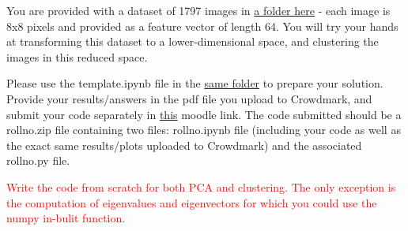\documentclass[solution,addpoints,12pt]{exam}
\newcommand{\red}[1]{\textcolor{red}{#1}}
\begin{document}
\begin{questions}


You are provided with a dataset of 1797 images in \href{https://drive.google.com/drive/folders/1emTvy-U4ZBnefQBddwTWP49oGQm8V2Gs?usp=sharing}{a folder here} - each image is 8x8 pixels and provided as a feature vector of length 64. You will try your hands at transforming this dataset to a lower-dimensional space, and clustering the images in this reduced space. 

Please use the template.ipynb file in the \href{https://drive.google.com/drive/folders/1emTvy-U4ZBnefQBddwTWP49oGQm8V2Gs?usp=sharing}{same folder} to prepare your solution. Provide your results/answers in the pdf file you upload to Crowdmark, and submit your code separately in \href{https://coursesnew.iitm.ac.in/mod/assign/view.php?id=26503}{this} moodle link. The code submitted should be a rollno.zip file containing two files: rollno.ipynb file (including your code as well as the exact same results/plots uploaded to Crowdmark) and the associated rollno.py file.

\red{Write the code from scratch for both PCA and clustering. The only exception is the computation of eigenvalues and eigenvectors for which you could use the numpy in-bulit function.}

\end{questions}
\end{document}
